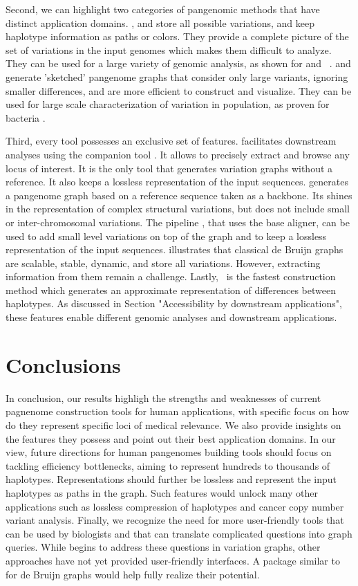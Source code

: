 Second, we can highlight two categories of pangenomic methods that have distinct application domains. \pggb, \mcactus and \bifrost store all possible variations, and keep haplotype information as paths or colors. They provide a complete picture of the set of variations in the input genomes which makes them difficult to analyze. They can be used for a large variety of genomic analysis, as shown for \mbox{\pggb} and \mbox{\mcactus}~\mbox{\cite{hdpr}}. \minigraph and \mdbg generate 'sketched' pangenome graphs that consider only large variants, ignoring smaller differences, and are more efficient to construct and visualize. They can be used for large scale characterization of variation in population, as proven for bacteria \mbox{\cite{mdbg}}.

Third, every tool possesses an exclusive set of features.
\pggb facilitates downstream analyses using the companion tool \odgi. It allows to precisely extract and browse any locus of interest. It is the only tool that generates variation graphs without a reference. It also keeps a lossless representation of the input sequences.
\minigraph generates a pangenome graph based on a reference sequence taken as a backbone. Its shines in the representation of complex structural variations, but does not include small or inter-chromosomal variations.
The pipeline \mcactus, that uses the \cactus base aligner, can be used to add small level variations on top of the \minigraph graph and to keep a lossless representation of the input sequences.
\bifrost illustrates that classical de Bruijn graphs are scalable, stable, dynamic, and store all variations. However, extracting information from them remain a challenge.
Lastly, \mdbg\ is the fastest construction method which generates an approximate representation of differences between haplotypes. As discussed in Section "Accessibility by downstream applications", these features enable different genomic analyses and downstream applications.

\section{Conclusions}
In conclusion, our results highligh the strengths and weaknesses of current pagnenome construction tools for human applications, with specific focus on how do they represent specific loci of medical relevance. We also provide insights on the features they possess and point out their best application domains.
In our view, future directions for human pangenomes building tools should focus on tackling efficiency bottlenecks, aiming to represent hundreds to thousands of haplotypes. Representations should further be lossless and represent the input haplotypes as paths in the graph. 
Such features would unlock many other applications such as lossless compression of haplotypes and cancer copy number variant analysis. 
Finally, we recognize the need for more user-friendly tools that can be used by biologists and that can translate complicated questions into  graph queries. While \odgi begins to address these questions in variation graphs, other approaches have not yet provided user-friendly interfaces. A package similar to \odgi for de Bruijn graphs would help fully realize their potential.

